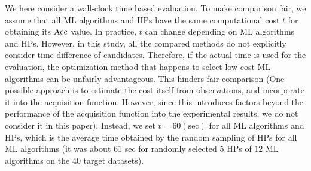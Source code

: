 
We here consider a wall-clock time based evaluation.
%
To make comparison fair, we assume that all ML algorithms and HPs have the same computational cost $t$ for obtaining its $\mathrm{Acc}$ value.
%
In practice, $t$ can change depending on ML algorithms and HPs.
%
However, in this study, all the compared methods do not explicitly consider time difference of candidates.
%
Therefore, if the actual time is used for the evaluation, the optimization method that happens to select low cost ML algorithms can be unfairly advantageous.
%
This hinders fair comparison 
(One possible approach is to estimate the cost itself from observations, and incorporate it into the acquisition function. 
%
However, since this introduces factors beyond the performance of the acquisition function into the experimental results, we do not consider it in this paper). 
%
Instead, we set $t = 60 (\text{sec})$ for all ML algorithms and HPs, which is the average time obtained by the random sampling of HPs for all ML algorithms (it was about $61$ sec for randomly selected $5$ HPs of $12$ ML algorithms on the $40$ target datasets).



